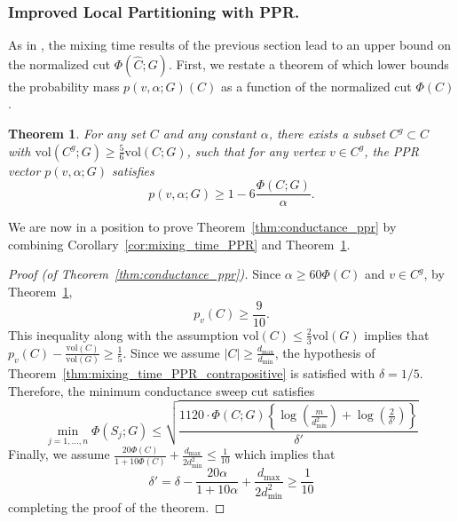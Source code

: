 \documentclass[11pt,twoside]{article}
\newtheorem{theorem}{Theorem}
\theoremstyle{definition}
\newcommand{\vol}{\mathrm{vol}}
\newcommand{\abs}[1]{\left \lvert #1 \right \rvert}
\newcommand{\1}{\mathbbm{1}}
\newcommand{\Cest}{\widehat{C}}
\begin{document}
\subsubsection{Improved Local Partitioning with PPR.}

As in \citet{andersen2006}, the mixing time results of the previous section lead to an upper bound on the normalized cut $\Phi(\Cest;G)$. First, we restate a theorem of \citet{andersen2006} which lower bounds the probability mass $p(v,\alpha;G)(C)$ as a function of the normalized cut $\Phi(C)$. 

\begin{theorem}
	\label{thm:acl_3}
	For any set $C$ and any constant $\alpha$, there exists a subset $C^g \subset C$ with $\vol(C^g;G) \geq \frac{5}{6}\vol(C;G)$, such that for any vertex $v \in C^g$, the PPR vector $p(v,\alpha;G)$ satisfies
	\begin{equation*}
	p(v,\alpha;G) \geq 1 - 6\frac{\Phi(C;G)}{\alpha}.
	\end{equation*}
\end{theorem}
We are now in a position to prove Theorem~\ref{thm:conductance_ppr} by combining Corollary~\ref{cor:mixing_time_PPR} and Theorem~\ref{thm:acl_3}.

\begin{proof}[Proof (of Theorem~\ref{thm:conductance_ppr})]
	Since $\alpha \geq 60\Phi(C)$ and $v \in C^g$, by Theorem~\ref{thm:acl_3},
	\begin{equation*}
	p_v(C) \geq \frac{9}{10}.
	\end{equation*}
	This inequality along with the assumption $\vol(C) \leq \frac{2}{3}\vol(G)$ implies that $p_v(C) - \frac{\vol(C)}{\vol(G)} \geq \frac{1}{5}$. Since we assume $\abs{C} \geq \frac{d_{\max}}{d_{\min}}$, the hypothesis of Theorem~\ref{thm:mixing_time_PPR_contrapositive} is satisfied with $\delta = 1/5$. Therefore, the minimum conductance sweep cut satisfies
	\begin{equation*}
	\min_{j = 1,\ldots,n} \Phi(S_j;G) \leq \sqrt{\frac{1120\cdot \Phi(C;G)\left\{\log\left(\frac{m}{d_{\min}^2}\right) + \log\left(\frac{2}{\delta'}\right)\right\}}{\delta'}}
	\end{equation*}
	Finally, we assume $\frac{20\Phi(C)}{1 + 10\Phi(C)} + \frac{d_{\max}}{2d_{\min}^2} \leq \frac{1}{10}$ which implies that
	\begin{equation*}
	\delta' = \delta - \frac{20\alpha}{1 + 10\alpha} + \frac{d_{\max}}{2d_{\min}^2} \geq \frac{1}{10} 
	\end{equation*}
	completing the proof of the theorem.
\end{proof}
\end{document}
